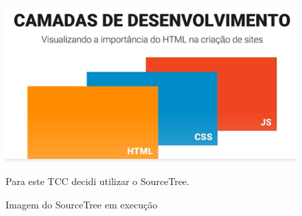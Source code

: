 	\begin{figure}[H]
		\centering
		\caption{Imagem do SourceTree em execução}
		\centering
		\includegraphics[scale=0.9]{./images/Figure_4}	
		
		Para este TCC decidi utilizar o SourceTree.	
		
		\label{fig:Fig4}
	\end{figure}
